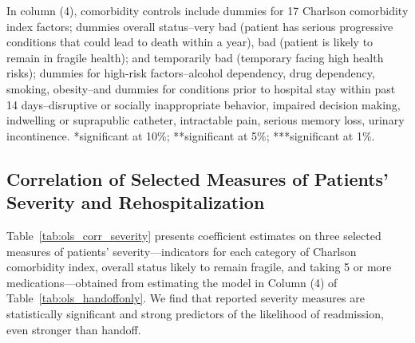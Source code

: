 \documentclass[final,12pt, notitlepage]{article}
\begin{document}
\begin{singlespace}
\begin{table}[H]
\begin{threeparttable}
\begin{tablenotes}
	In column (4), comorbidity controls include dummies for 17 Charlson comorbidity index factors; dummies overall status--very bad (patient has serious progressive conditions that could lead to death within a year), bad (patient is likely to remain in fragile health); and temporarily bad (temporary facing high health risks); dummies for high-risk factors--alcohol dependency, drug dependency, smoking, obesity--and dummies for conditions prior to hospital stay within past 14 days--disruptive or socially inappropriate behavior, impaired decision making, indwelling or suprapublic catheter, intractable pain, serious memory loss, urinary incontinence.
	 *significant at 10\%; **significant at 5\%; ***significant at 1\%.
	\end{tablenotes}
\end{threeparttable}
\end{table}



\clearpage
\subsection{Correlation of Selected Measures of Patients' Severity and Rehospitalization}
\label{appendix:corr_severity}

Table~\ref{tab:ols_corr_severity} presents coefficient estimates on three selected measures of patients' severity---indicators for each category of Charlson comorbidity index, overall status likely to remain fragile, and taking 5 or more medications---obtained from estimating the model in Column (4) of Table~\ref{tab:ols_handoffonly}.
We find that reported severity measures are statistically significant and strong predictors of the likelihood of readmission, even stronger than handoff.


\end{singlespace}
\end{document}
